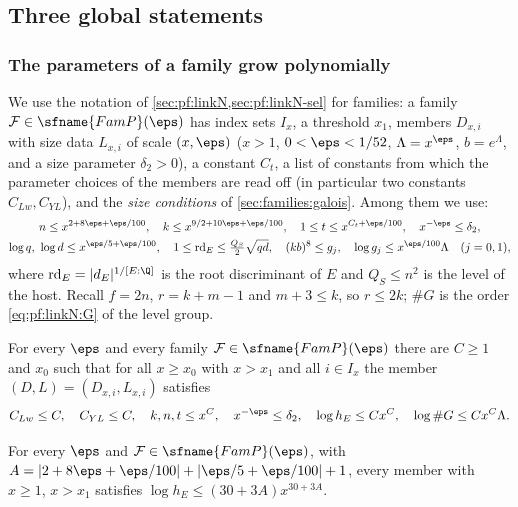 \subsection{Three global statements}\label{pf:sh-hodge:glob}

\subsubsection{The parameters of a family grow polynomially}

We use the notation of \cref{sec:pf:linkN,sec:pf:linkN-sel} for families: a family $\mathcal F\in\sfname{FamP}(\eps)$ has index sets $I_x$, a
threshold $x_1$, members $D_{x,i}$ with size data $L_{x,i}$ of scale $(x,\eps)$ ($x>1$, $0<\eps<1/52$, $\Lambda=x^\eps$, $b=e^\Lambda$, and a
size parameter $\delta_2>0$), a constant $C_t$, a list of constants from which the parameter choices of the members are read off (in particular
two constants $C_{Lw},C_{YL}$), and the \emph{size conditions} of \cref{sec:families:galois}. Among them we use:
\begin{equation}\label{eq:pf:sh-hodge:sizes}
\begin{gathered}
n\le x^{2+8\eps+\eps/100},\quad k\le x^{9/2+10\eps+\eps/100},\quad 1\le t\le x^{C_t+\eps/100},\quad x^{-\eps}\le\delta_2,\\
\log q,\ \log d\le x^{\eps/5+\eps/100},\quad 1\le\mathrm{rd}_E\le\tfrac{Q_S}{2}\sqrt{qd},\quad (kb)^8\le g_j,\quad \log g_j\le x^{\eps/100}\Lambda\quad(j=0,1),
\end{gathered}
\end{equation}
where $\mathrm{rd}_E=|d_E|^{1/[E:\Q]}$ is the root discriminant of $E$ and $Q_S\le n^2$ is the level of the host. Recall $f=2n$, $r=k+m-1$ and
$m+3\le k$, so $r\le2k$; $\#G$ is the order \eqref{eq:pf:linkN:G} of the level group.

\begin{theorem}\label{pf:sh-hodge:par}
For every $\eps$ and every family $\mathcal F\in\sfname{FamP}(\eps)$ there are $C\ge1$ and $x_0$ such that for all $x\ge x_0$ with $x>x_1$ and all
$i\in I_x$ the member $(D,L)=(D_{x,i},L_{x,i})$ satisfies
\[
C_{Lw}\le C,\quad C_{YL}\le C,\quad k,n,t\le x^C,\quad x^{-\eps}\le\delta_2,\quad \log h_E\le Cx^C,\quad \log\#G\le Cx^C\Lambda .
\]
\end{theorem}

\begin{lemma}\label{pf:sh-hodge:hE}
For every $\eps$ and $\mathcal F\in\sfname{FamP}(\eps)$, with $A=|2+8\eps+\eps/100|+|\eps/5+\eps/100|+1$, every member with $x\ge1$, $x>x_1$ satisfies
$\log h_E\le(30+3A)x^{30+3A}$.
\end{lemma}

